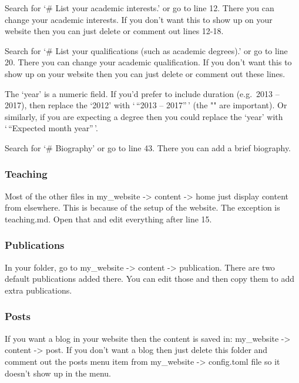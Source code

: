\documentclass[
]{book}
\begin{document}
Search for `\# List your academic interests.' or go to line 12. There you can change your academic interests. If you don't want this to show up on your website then you can just delete or comment out lines 12-18.

Search for `\# List your qualifications (such as academic degrees).' or go to line 20. There you can change your academic qualification. If you don't want this to show up on your website then you can just delete or comment out these lines.

The `year' is a numeric field. If you'd prefer to include duration (e.g.~2013 -- 2017), then replace the `2012' with `\,``2013 -- 2017''\,' (the "" are important). Or similarly, if you are expecting a degree then you could replace the `year' with `\,``Expected month year''\,'.

Search for `\# Biography' or go to line 43. There you can add a brief biography.

\hypertarget{teaching}{%
\subsubsection{Teaching}\label{teaching}}

Most of the other files in my\_website -\textgreater{} content -\textgreater{} home just display content from elsewhere. This is because of the setup of the website. The exception is teaching.md. Open that and edit everything after line 15.

\hypertarget{publications}{%
\subsubsection{Publications}\label{publications}}

In your folder, go to my\_website -\textgreater{} content -\textgreater{} publication. There are two default publications added there. You can edit those and then copy them to add extra publications.

\hypertarget{posts}{%
\subsubsection{Posts}\label{posts}}

If you want a blog in your website then the content is saved in: my\_website -\textgreater{} content -\textgreater{} post. If you don't want a blog then just delete this folder and comment out the posts menu item from my\_website -\textgreater{} config.toml file so it doesn't show up in the menu.
\end{document}
